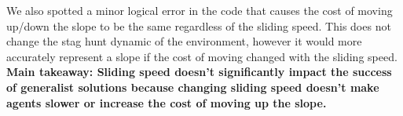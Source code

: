 \documentclass[12pt]{article}
\begin{document}
We also spotted a minor logical error in the code that causes the cost of moving up/down the slope to be the same regardless of the sliding speed. This does not change the stag hunt dynamic of the environment, however it would more accurately represent a slope if the cost of moving changed with the sliding speed.\\ 

\textbf{Main takeaway: Sliding speed doesn't significantly impact the success of generalist solutions because changing sliding speed doesn't make agents slower or increase the cost of moving up the slope.}

\begin{figure}[!tbp]
  \centering
  \hfill
  \hfill
  

\end{figure}
\end{document}
